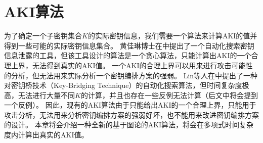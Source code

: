 
\chapter{AKI算法}
\label{chap:Alg}

为了确定一个子密钥集合$K$的实际密钥信息，我们需要一个算法来计算AKI的值并得到一些可能的实际密钥信息集合。
黄佳琳博士在中提出了一个自动化搜索密钥信息泄露的工具，但该工具设计的算法是一个贪心算法，只能计算出AKI的一个合理上界，无法得到真实的AKI值。
一个AKI的合理上界可以用来进行攻击可能性的分析，但无法用来实际分析一个密钥编排方案的强弱。
Lin等人在中提出了一种对密钥桥技术（Key-Bridging Technique）的自动化搜索算法，但时间复杂度极高，无法进行大量不同$K$的计算，并且也存在一些反例无法计算（后文中将会提到一个反例）。
因此，现有的AKI算法由于只能给出AKI的一个合理上界，只能用于攻击分析，无法用来分析密钥编排方案的强弱好坏，也不能用来改进密钥编排方案的设计。
本章将会介绍一种全新的基于图论的AKI算法，将会在多项式时间复杂度内计算出真实的AKI值。

